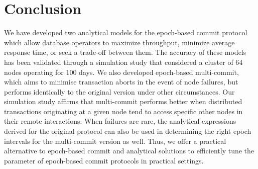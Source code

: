 \section{Conclusion}
\label{sec:conclusion}

We have developed two analytical models for the epoch-based commit protocol which allow database operators to 
maximize throughput, minimize average response time, or seek a trade-off between them. The accuracy of these 
models has been validated through a simulation study that considered a cluster of 64 nodes operating for 100 
days. We also developed epoch-based multi-commit, which aims to minimise transaction aborts in the event of node 
failures, but performs identically to the original version under other circumstances. Our simulation study 
affirms that multi-commit performs better when distributed transactions originating at a given node tend to 
access specific other nodes in their remote interactions. 
When failures are rare, the analytical expressions derived for the original protocol can also be used in 
determining the right epoch intervals for the multi-commit version as well. Thus, we offer a practical 
alternative to epoch-based commit and analytical solutions to efficiently tune the parameter of epoch-based 
commit protocols in practical settings.  

